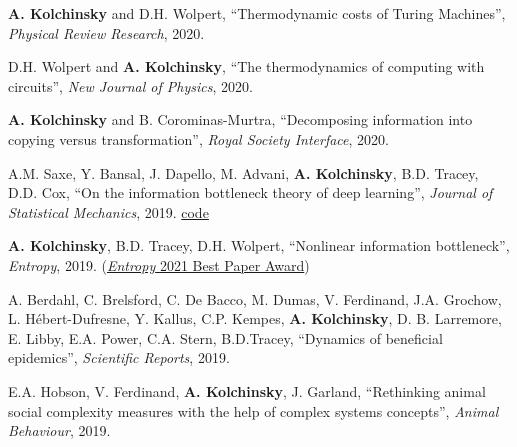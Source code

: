 \textbf{A. Kolchinsky} and D.H. Wolpert, ``Thermodynamic costs of Turing Machines'', \emph{Physical Review Research}, 2020. %
 

D.H. Wolpert and \textbf{A. Kolchinsky}, ``The thermodynamics of computing with circuits'', \emph{New Journal of Physics}, 2020.  %
 

\textbf{A. Kolchinsky} and B. Corominas-Murtra, ``Decomposing information into copying versus transformation'', \emph{Royal Society Interface}, 2020. %
 

A.M. Saxe, Y. Bansal, J. Dapello, M. Advani, \textbf{A. Kolchinsky}, B.D. Tracey, D.D. Cox, ``On the information bottleneck theory of deep learning'',  \emph{Journal of Statistical Mechanics}, 2019.  \href{https://github.com/artemyk/ibsgd/tree/iclr2018}{code}  %

\textbf{A. Kolchinsky}, B.D. Tracey, D.H. Wolpert, ``Nonlinear information bottleneck'', \emph{Entropy}, 2019.
 (\href{https://www.mdpi.com/journal/entropy/awards/1209}{{\emph{Entropy} 2021 Best Paper Award}})  

A. Berdahl, C. Brelsford, C. De Bacco, M. Dumas, V. Ferdinand, J.A. Grochow, L. Hébert-Dufresne, Y. Kallus, C.P. Kempes, \textbf{A. Kolchinsky}, D. B. Larremore, E. Libby, E.A. Power, C.A. Stern, B.D.Tracey, ``Dynamics of beneficial epidemics'', \emph{Scientific Reports}, 2019.  

E.A. Hobson, V. Ferdinand, \textbf{A. Kolchinsky}, J. Garland, ``Rethinking animal social complexity measures with the help of complex systems concepts'', \emph{Animal Behaviour}, 2019.  

